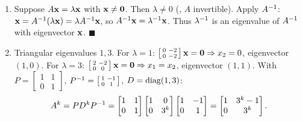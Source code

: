 \begin{enumerate}[label=\textbf{6.\arabic*},leftmargin=2.6em,itemsep=8pt]
\item Suppose $A\mathbf{x}=\lambda\mathbf{x}$ with $\mathbf{x}\neq\mathbf{0}$. Then $\lambda\neq0$ (, $A$ invertible). Apply $A^{-1}$: $\mathbf{x}=A^{-1}(\lambda\mathbf{x})=\lambda A^{-1}\mathbf{x}$, so $A^{-1}\mathbf{x}=\lambda^{-1}\mathbf{x}$. Thus $\lambda^{-1}$ is an eigenvalue of $A^{-1}$ with eigenvector $\mathbf{x}$. $\blacksquare$

\item Triangular eigenvalues $1,3$. For $\lambda=1$: $\left[\begin{smallmatrix}0&-2\\0&-2\end{smallmatrix}\right]\mathbf{x}=\mathbf{0}\Rightarrow x_2=0$, eigenvector $(1,0)$. For $\lambda=3$: $\left[\begin{smallmatrix}2&-2\\0&0\end{smallmatrix}\right]\mathbf{x}=\mathbf{0}\Rightarrow x_1=x_2$, eigenvector $(1,1)$. With $P=\left[\begin{smallmatrix}1&1\\0&1\end{smallmatrix}\right]$, $P^{-1}=\left[\begin{smallmatrix}1&-1\\0&1\end{smallmatrix}\right]$, $D=\operatorname{diag}(1,3)$:
\[
A^k=PD^kP^{-1}=\begin{bmatrix}1&1\\0&1\end{bmatrix}\begin{bmatrix}1&0\\0&3^k\end{bmatrix}\begin{bmatrix}1&-1\\0&1\end{bmatrix}=\begin{bmatrix}1&3^k-1\\0&3^k\end{bmatrix}.
\]

\end{enumerate}
